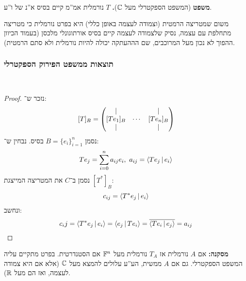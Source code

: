 \documentclass[name=רשימות אלגברה לינארית 2א]{../../../tex/classes/megasumPreamble}
\begin{document}
	\textbf{משפט} (המשפט הספקטרלי מעל $\mathbb{C}$)\textbf{. }{$T$ נורמלית אמ''מ קיים בסיס א''נ של ו''ע. }
	
	משום שמטריצה הרמטית (וצמודה לעצמה באופן כללי) היא בפרט נורמלית כי מטריצה מתחלפת עם עצמה, נסיק שלצמודה לעצמה קיים בסיס אורתוגונלי מלכסן (בעמוד הכיוון ההפוך לא נכון מעל המרוכבים, שם הההעתקה יכולה להיות נורמלית ולא סתם הרמטית). 
	
	
	\subsubsection{תוצאות ממשפט הפירוק הספקטרלי}\ 
	
	\begin{proof}
		נזכר ש־: 
		\[ [T]_B = \begin{pmatrix} \vert &  & \vert \\ [Te_1]_B & \cdots & [Te_n]_B \\ \vert &  & \vert \end{pmatrix} \]
		נסמן $B = \{e_i\}_{i = 1}^{n}$ בסיס. נבחין ש־: 
		\[ Te_j = \sumni a_{ij}e_i, \ a_{ij} = \mut{Te_j}{e_i} \]
		נסמן ב־$C$ את המטריצה המייצגת $[T^*]_B$: 
		\[ c_{ij} = \left \langle T^*e_j \,\middle|\, e_i \right \rangle \]
		ונחשב: 
		\[ c_ij = \left \langle T^*e_j \,\middle|\, e_i \right \rangle = \left \langle e_j \,\middle|\, Te_i \right \rangle = \overline{\left \langle Te_i \,\middle|\, e_j \right \rangle} = a_{ij} \]
		
	\end{proof}
	
	\textbf{מסקנה: }אם $A$ נורמלית אז $T_A$ נורמלית מעל $\mathbb{F}^n$ אם הסטנדרטית. בפרט מתקיים עליה המשפט הספקטרלי. גם אם $A$ ממשית, הע''ע עלולים להמצא מעל $\mathbb{C}$ (אלא אם היא צמודה לעצמה, ואז הם מעל $\mathbb{R}$). 
	
	
\end{document}
